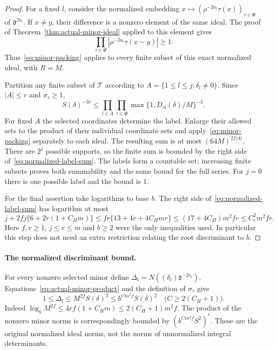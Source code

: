 \begin{proof}
For a fixed $l$, consider the normalized embedding
$x\mapsto(\rho^{-2a_l}\tau(x))_{\tau\in\Phi}$ of
$\mathfrak d^{2a_l}$.  If $x\ne y$, their difference is a
nonzero element of the same ideal.  The proof of
Theorem~\ref{thm:actual-minor-ideal} applied to this element gives
\[
 \prod_{\tau\in\Phi}
       |\rho^{-2a_l}\tau(x-y)|\ge1.
\]
Thus~\eqref{eq:minor-packing} applies to every finite subset of
this exact normalized ideal, with $R=M$.

Partition any finite subset of $\mathcal T$ according to
$A=\{1\le l\le j:\delta_l\ne0\}$.
Since $|A|\le r$ and $\sigma_\tau\ge1$,
\[
 S(\delta)^{-3r}\le
 \prod_{l\in A}\prod_{\tau\in\Phi}
       \max\{1,D_{\tau l}(\delta)/M\}^{-3}.
\]
For fixed $A$ the selected coordinates determine the label.
Enlarge their allowed sets to the product of their individual
coordinate sets and apply~\eqref{eq:minor-packing} separately to
each ideal.  The resulting sum is at most $(64M)^{2f|A|}$.
There are $2^j$ possible supports, so the finite sum is bounded
by the right side of~\eqref{eq:normalized-label-sum}.
The labels form a countable set; increasing finite subsets proves
both summability and the same bound for the full series.
For $j=0$ there is one possible label and the bound is $1$.

For the final assertion take logarithms to base $b$.  The right
side of~\eqref{eq:normalized-label-sum} has logarithm at most
\[
 j+2fj\{6+2r(1+C_Hm)\}
 \le fr\{13+4r+4C_Hmr\}
 \le (17+4C_H)m^2fr
 \le C_c^2m^2fr.
\]
Here $f,r\ge1$, $j\le r\le m$ and $b\ge2$ were the only
inequalities used.  In particular this step does not need an
extra restriction relating the root discriminant to $b$.
\end{proof}

\paragraph{The normalized discriminant bound.}
For every nonzero selected minor define
$\Delta_l=N((\delta_l)\mathfrak d^{-2a_l})$.
Equations~\eqref{eq:actual-minor-product} and the definition of
$\sigma_\tau$ give
\begin{equation}\label{eq:minor-height-bound}
 1\le\Delta_l\le M^{2f}S(\delta)^2
       \le b^{C m^2f}S(\delta)^2
       \quad\bigl(C\ge2(C_H+1)\bigr).
\end{equation}
Indeed $\log_bM^{2f}\le4rf(1+C_Hm)\le2(C_H+1)m^2f$.
The product of the nonzero minor norms is correspondingly bounded by
$(b^{Cm^2f}S^2)^r$.  These are the original normalized ideal norms,
not the norms of unnormalized integral determinants.

